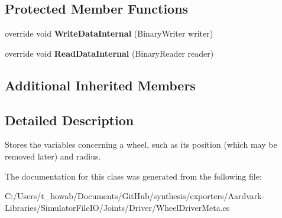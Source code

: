 \subsection*{Protected Member Functions}
\begin{DoxyCompactItemize}
\item 
\mbox{\label{class_wheel_driver_meta_af16c093144351806dac1b82cf086accd}} 
override void {\bfseries Write\+Data\+Internal} (Binary\+Writer writer)
\item 
\mbox{\label{class_wheel_driver_meta_abbe82770a8ba8730635ecf39490fd476}} 
override void {\bfseries Read\+Data\+Internal} (Binary\+Reader reader)
\end{DoxyCompactItemize}
\subsection*{Additional Inherited Members}


\subsection{Detailed Description}
Stores the variables concerning a wheel, such as its position (which may be removed later) and radius. 



The documentation for this class was generated from the following file\+:\begin{DoxyCompactItemize}
\item 
C\+:/\+Users/t\+\_\+howab/\+Documents/\+Git\+Hub/synthesis/exporters/\+Aardvark-\/\+Libraries/\+Simulator\+File\+I\+O/\+Joints/\+Driver/Wheel\+Driver\+Meta.\+cs\end{DoxyCompactItemize}
